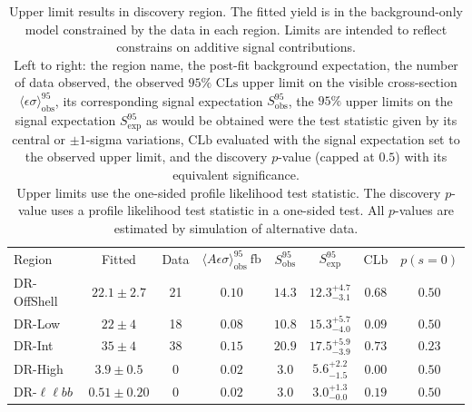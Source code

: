 \FloatBarrier
\begin{table}[tp]
\centering
\begin{tabular*}{\textwidth}{lccccccc}
{Region} &
\multicolumn{1}{c}{Fitted} &
\multicolumn{1}{l}{Data} &
$\langle A\epsilon{ \sigma}\rangle_{\mathrm{obs}}^{95}~\mathrm{fb}$ &
\multicolumn{1}{c}{$S_{\mathrm{obs}}^{95}$}  &
\multicolumn{1}{c}{$S_{\mathrm{exp}}^{95}$} &
$\mathrm{CLb}$ &
$p(s=0)$  \\[1.5ex]
DR-OffShell      & $22.1\pm2.7$ & 21 & $0.10$ & $14.3$ & $12.3^{+4.7}_{-3.1}$ & $0.68$ & $0.50$ \\[.5ex]
DR-Low           & $22\pm4$ & 18 & $0.08$ & $10.8$ & $15.3^{+5.7}_{-4.0}$ & $0.09$ & $0.50$ \\[.5ex]
DR-Int           & $35\pm4$ & 38 & $0.15$ & $20.9$ & $17.5^{+5.9}_{-3.9}$ & $0.73$ & $0.23$ \\[.5ex]
DR-High          & $3.9\pm0.5$  & 0  & $0.02$ & $3.0$ & $5.6^{+2.2}_{-1.5}$ & $0.00$ & $0.50$ \\[.5ex]
DR-$\ell\ell bb$ & $0.51\pm0.20$  & 0  & $0.02$ & $3.0$ & $3.0^{+1.3}_{-0.0}$ & $0.19$ & $0.50$ \\[.5ex]
\end{tabular*}
\caption{%
Upper limit results in discovery region.
The fitted yield is in the background-only model constrained by the data in each region.
Limits are intended to reflect constrains on additive signal contributions.
\\[0.5em]
Left to right:
the region name,
the post-fit background expectation,
the number of data observed,
the observed $95\%$ $\mathrm{CLs}$ upper limit on the visible cross-section
$\langle\epsilon\sigma\rangle_\mathrm{obs}^{95}$,
its corresponding signal expectation $S_\mathrm{obs}^{95}$,
the  $95\%$ upper limits on the signal expectation $S_\mathrm{exp}^{95}$
as would be obtained were the test statistic given by its central or
$\pm1$-sigma variations,
$\mathrm{CLb}$ evaluated with the signal expectation set to the observed upper limit,
and the discovery $p$-value (capped at $0.5$) with its equivalent significance.
\\[0.5em]
Upper limits use the one-sided profile likelihood test statistic.
The discovery $p$-value uses a profile likelihood test statistic in a one-sided test.
All $p$-values are estimated by simulation of alternative data.
}
\label{tab:2ljets_discovery}
\end{table}


